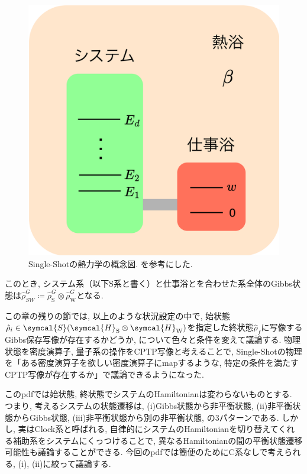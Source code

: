 \begin{figure}[H]
  \centering
  \includegraphics[keepaspectratio, scale=0.04]{images/Single-Shot_quantumthermo.drawio.png}
  \caption{Single-Shotの熱力学の概念図. \cite{PhysLabResource}を参考にした. }
  \label{fig:Single-Shot_quantumtherm}
\end{figure}

このとき, システム系（以下S系と書く）と仕事浴とを合わせた系全体のGibbs状態は$\hat{\rho}_{SW}^G\coloneqq\hat{\rho}_{\text{S}}^G\otimes\hat{\rho}_{\text{W}}^G$となる. 

この章の残りの節では, 以上のような状況設定の中で, 始状態$\hat{\rho}_i\in\symcal{S}(\symcal{H}_{\text{S}}\otimes\symcal{H}_{\text{W}})$を指定した終状態$\hat{\rho}_{f}$に写像するGibbs保存写像が存在するかどうか, について色々と条件を変えて議論する. 
物理状態を密度演算子, 量子系の操作をCPTP写像と考えることで, Single-Shotの物理を「ある密度演算子を欲しい密度演算子にmapするような, 特定の条件を満たすCPTP写像が存在するか」で議論できるようになった. 

\begin{myrem}
  このpdfでは始状態, 終状態でシステムのHamiltonianは変わらないものとする. 
  つまり, 考えるシステムの状態遷移は, (i)Gibbs状態から非平衡状態, (ii)非平衡状態からGibbs状態, (iii)非平衡状態から別の非平衡状態, の3パターンである. 
  しかし, 実はClock系と呼ばれる, 自律的にシステムのHamiltonianを切り替えてくれる補助系をシステムにくっつけることで, 異なるHamiltonianの間の平衡状態遷移可能性も議論することができる\cite{SagawaEntropy}. 
  今回のpdfでは簡便のためにC系なしで考えられる, (i), (ii)に絞って議論する. 
\end{myrem}

